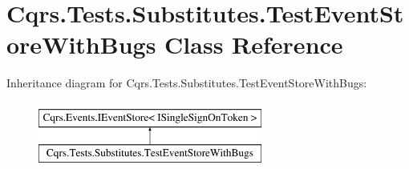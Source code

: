 \hypertarget{classCqrs_1_1Tests_1_1Substitutes_1_1TestEventStoreWithBugs}{}\section{Cqrs.\+Tests.\+Substitutes.\+Test\+Event\+Store\+With\+Bugs Class Reference}
\label{classCqrs_1_1Tests_1_1Substitutes_1_1TestEventStoreWithBugs}
Inheritance diagram for Cqrs.\+Tests.\+Substitutes.\+Test\+Event\+Store\+With\+Bugs\+:\begin{figure}[H]
\begin{center}
\leavevmode
\includegraphics[height=2.000000cm]{classCqrs_1_1Tests_1_1Substitutes_1_1TestEventStoreWithBugs}
\end{center}
\end{figure}
